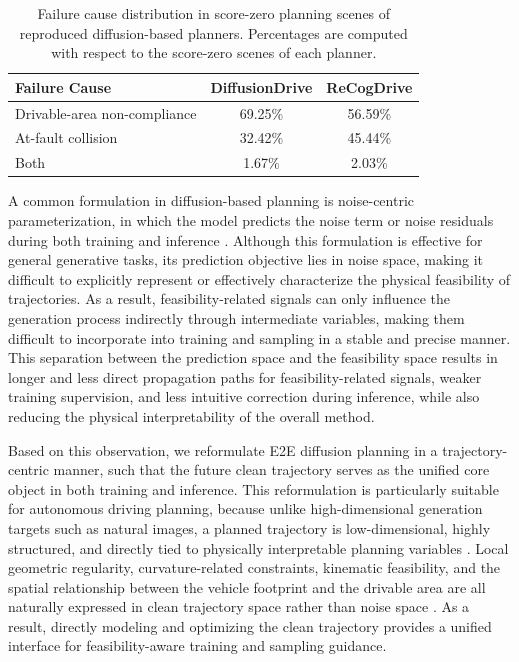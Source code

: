 \documentclass[3p,times,authoryear]{elsarticle}
\begin{document}
\begin{table}[t]
\centering
\caption{Failure cause distribution in score-zero planning scenes of reproduced diffusion-based planners. Percentages are computed with respect to the score-zero scenes of each planner. }
\small
\setlength{\tabcolsep}{6pt}
\renewcommand{\arraystretch}{1.08}
\begin{tabular}{lcc}
\toprule
\textbf{Failure Cause} & \textbf{DiffusionDrive} \citep{liao2025diffusiondrive} & \textbf{ReCogDrive} \citep{li2025recogdrive} \\
\midrule
Drivable-area non-compliance & 69.25\% & 56.59\% \\
At-fault collision           & 32.42\% & 45.44\% \\
Both                         & 1.67\%  & 2.03\% \\
\bottomrule
\end{tabular}
\label{tab:failure_cause_stats}
\end{table}

A common formulation in diffusion-based planning is noise-centric parameterization, in which the model predicts the noise term or noise residuals during both training and inference \citep{ho2020ddpm,song2020ddim,karras2022edm}. Although this formulation is effective for general generative tasks, its prediction objective lies in noise space, making it difficult to explicitly represent or effectively characterize the physical feasibility of trajectories. As a result, feasibility-related signals can only influence the generation process indirectly through intermediate variables, making them difficult to incorporate into training and sampling in a stable and precise manner. This separation between the prediction space and the feasibility space results in longer and less direct propagation paths for feasibility-related signals, weaker training supervision, and less intuitive correction during inference, while also reducing the physical interpretability of the overall method.

Based on this observation, we reformulate E2E diffusion planning in a trajectory-centric manner, such that the future clean trajectory serves as the unified core object in both training and inference. This reformulation is particularly suitable for autonomous driving planning, because unlike high-dimensional generation targets such as natural images, a planned trajectory is low-dimensional, highly structured, and directly tied to physically interpretable planning variables \citep{li2025jit}. Local geometric regularity, curvature-related constraints, kinematic feasibility, and the spatial relationship between the vehicle footprint and the drivable area are all naturally expressed in clean trajectory space rather than noise space \citep{katrakazas2015motionplanning,song2023motionplanningcontrol,rahman2025trajectory}. As a result, directly modeling and optimizing the clean trajectory provides a unified interface for feasibility-aware training and sampling guidance.
\end{document}
